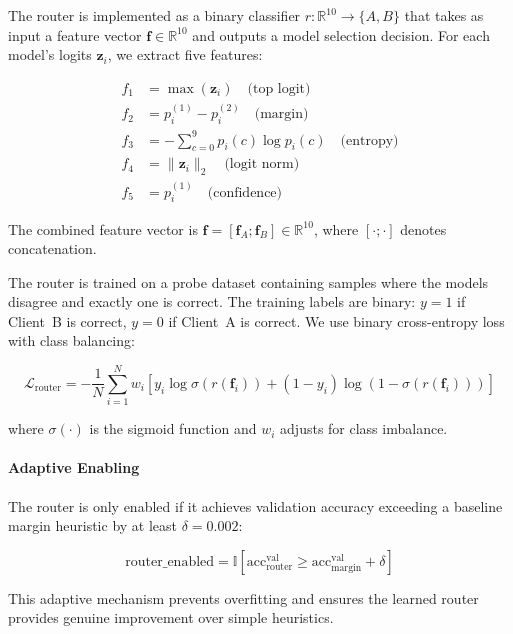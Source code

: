 The router is implemented as a binary classifier $r: \mathbb{R}^{10} \rightarrow \{A, B\}$ that takes as input a feature vector $\mathbf{f} \in \mathbb{R}^{10}$ and outputs a model selection decision. For each model's logits $\mathbf{z}_i$, we extract five features:

\begin{align}
f_1 &= \max(\mathbf{z}_i) \quad \text{(top logit)} \\
f_2 &= p_i^{(1)} - p_i^{(2)} \quad \text{(margin)} \\
f_3 &= -\sum_{c=0}^{9} p_i(c) \log p_i(c) \quad \text{(entropy)} \\
f_4 &= \|\mathbf{z}_i\|_2 \quad \text{(logit norm)} \\
f_5 &= p_i^{(1)} \quad \text{(confidence)}
\end{align}

The combined feature vector is $\mathbf{f} = [\mathbf{f}_A; \mathbf{f}_B] \in \mathbb{R}^{10}$, where $[\cdot; \cdot]$ denotes concatenation.

The router is trained on a probe dataset containing samples where the models disagree and exactly one is correct. The training labels are binary: $y=1$ if Client~B is correct, $y=0$ if Client~A is correct. We use binary cross-entropy loss with class balancing:

\begin{equation}
\mathcal{L}_{\text{router}} = -\frac{1}{N}\sum_{i=1}^{N} w_i \left[y_i \log \sigma(r(\mathbf{f}_i)) + (1-y_i) \log(1-\sigma(r(\mathbf{f}_i)))\right]
\end{equation}

where $\sigma(\cdot)$ is the sigmoid function and $w_i$ adjusts for class imbalance.

\paragraph{Adaptive Enabling}

The router is only enabled if it achieves validation accuracy exceeding a baseline margin heuristic by at least $\delta = 0.002$:

\begin{equation}
\text{router\_enabled} = \mathbb{I}[\text{acc}_{\text{router}}^{\text{val}} \geq \text{acc}_{\text{margin}}^{\text{val}} + \delta]
\end{equation}

This adaptive mechanism prevents overfitting and ensures the learned router provides genuine improvement over simple heuristics.

